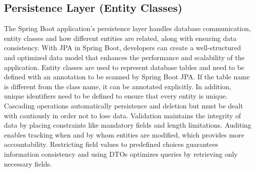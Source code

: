     \subsection{Persistence Layer (Entity Classes)}
    The Spring Boot application's persistence layer handles database communication, entity classes and how different entities are related, along with ensuring data consistency. With JPA in Spring Boot, developers can create a well-structured and optimized data model that enhances the performance and scalability of the application. \newline
    Entity classes are used to represent database tables and need to be defined with an annotation to be scanned by Spring Boot JPA. If the table name is different from the class name, it can be annotated explicitly. In addition, unique identifiers need to be defined to ensure that every entity is unique.\newline
    Cascading operations automatically persistence and deletion but must be dealt with cautiously in order not to lose data. Validation maintains the integrity of data by placing constraints like mandatory fields and length limitations.\newline
    Auditing enables tracking when and by whom entities are modified, which provides more accountability. Restricting field values to predefined choices guarantees information consistency and using DTOs optimizes queries by retrieving only necessary fields.

